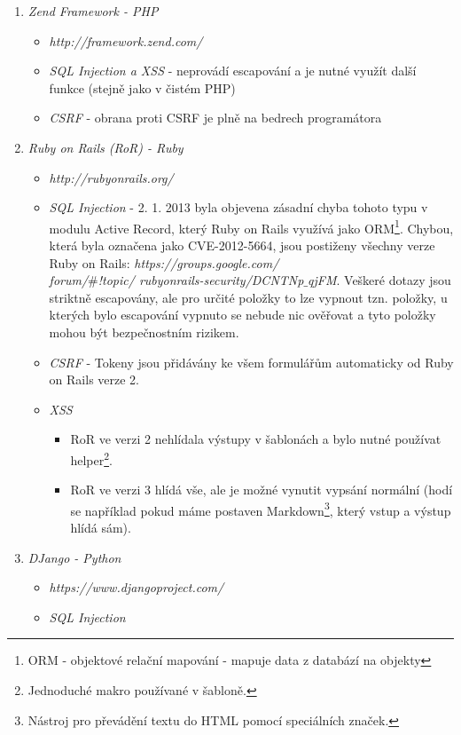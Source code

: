 \documentclass[12pt, a4paper]{report}
\begin{document}
\begin{enumerate}
\item \textit{Zend Framework - PHP} 
\begin{itemize}
\item \textit{http://framework.zend.com/}
\item \textit{SQL Injection a XSS} - neprovádí escapování a je nutné využít další funkce (stejně jako v čistém PHP)
\item \textit{CSRF} - obrana proti CSRF je plně na bedrech programátora
\end{itemize}
\item \textit{Ruby on Rails (RoR) - Ruby}
\begin{itemize}
\item \textit{http://rubyonrails.org/}
\item \textit{SQL Injection} - 2. 1. 2013 byla objevena zásadní chyba tohoto typu v modulu Active Record, který Ruby on Rails využívá jako ORM\footnote{ORM - objektové relační mapování - mapuje data z databází na objekty}. Chybou, která byla označena jako CVE-2012-5664, jsou postiženy všechny verze Ruby on Rails: \textit{https://groups.google.com/\\forum/$\#$!topic/ rubyonrails-security/DCNTNp$\_$qjFM}. Veškeré dotazy jsou striktně escapovány, ale pro určité položky to lze vypnout tzn. položky, u kterých bylo escapování vypnuto se nebude nic ověřovat a tyto položky mohou být bezpečnostním rizikem.
\item \textit{CSRF} - Tokeny jsou přidávány ke všem formulářům automaticky od Ruby on Rails verze 2.
\item \textit{XSS} 
\begin{itemize}
\item RoR ve verzi 2 nehlídala výstupy v šablonách a bylo nutné používat helper\footnote{Jednoduché makro používané v šabloně.}.
\item RoR ve verzi 3 hlídá vše, ale je možné vynutit vypsání normální (hodí se například pokud máme  postaven Markdown\footnote{Nástroj pro převádění textu do HTML pomocí speciálních značek.}, který vstup a výstup hlídá sám).
\end{itemize}
\end{itemize} 
\item \textit{DJango - Python}
\begin{itemize}
\item \textit{https://www.djangoproject.com/}
\item \textit{SQL Injection}
\begin{itemize}

\end{itemize}
\end{itemize}
\end{enumerate}
\end{document}
